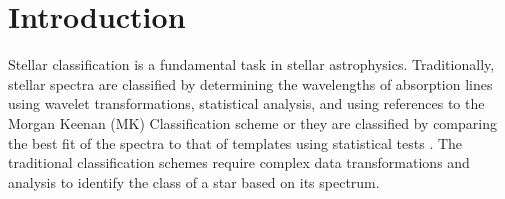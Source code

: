 \documentclass[trackchanges, floatfix, twocolumn, tighten]{aastex62}
\begin{document}


\section{Introduction}\label{sec:intro}

Stellar classification is a fundamental task in stellar astrophysics. Traditionally, stellar spectra are classified by determining the wavelengths of absorption lines using wavelet transformations, statistical analysis, and using references to the Morgan Keenan (MK) Classification scheme \citep{MorganKeenan} or they are classified by comparing the best fit of the spectra to that of templates using statistical tests \citep{Duan}. The traditional classification schemes require complex data transformations and analysis to identify the class of a star based on its spectrum.
\end{document}
